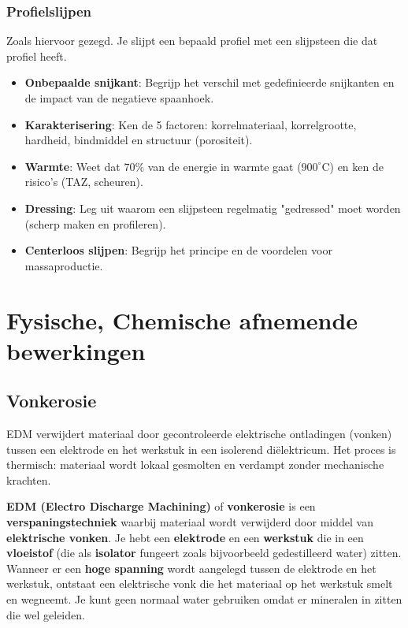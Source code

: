 \documentclass[a4paper,12pt,twoside]{report}
\begin{document}
\subsection{Profielslijpen}
Zoals hiervoor gezegd. Je slijpt een bepaald profiel met een slijpsteen die dat profiel heeft.

\begin{warningbox}[title=EXAMEN CHECKLIST: SLIJPEN]
    \begin{itemize}
        \item \textbf{Onbepaalde snijkant}: Begrijp het verschil met gedefinieerde snijkanten en de impact van de negatieve spaanhoek.
        \item \textbf{Karakterisering}: Ken de 5 factoren: korrelmateriaal, korrelgrootte, hardheid, bindmiddel en structuur (porositeit).
        \item \textbf{Warmte}: Weet dat $70\%$ van de energie in warmte gaat ($900^\circ$C) en ken de risico's (TAZ, scheuren).
        \item \textbf{Dressing}: Leg uit waarom een slijpsteen regelmatig "gedressed" moet worden (scherp maken en profileren).
        \item \textbf{Centerloos slijpen}: Begrijp het principe en de voordelen voor massaproductie.
    \end{itemize}
\end{warningbox}

\chapter{Fysische, Chemische afnemende bewerkingen}

\section{Vonkerosie}

\begin{conceptbox}[title=EDM (Electro Discharge Machining)]
    EDM verwijdert materiaal door gecontroleerde elektrische ontladingen (vonken) tussen een elektrode en het werkstuk in een isolerend diëlektricum. Het proces is thermisch: materiaal wordt lokaal gesmolten en verdampt zonder mechanische krachten.
\end{conceptbox}

\textbf{EDM (Electro Discharge Machining)} of \textbf{vonkerosie} is een \textbf{verspaningstechniek} waarbij materiaal wordt
verwijderd door middel van \textbf{elektrische vonken}.
Je hebt een \textbf{elektrode} en een \textbf{werkstuk} die in een \textbf{vloeistof} (die als \textbf{isolator} fungeert zoals bijvoorbeeld gedestilleerd water) zitten.
Wanneer er een \textbf{hoge spanning} wordt aangelegd tussen de elektrode en het werkstuk, ontstaat
een elektrische vonk die het materiaal op het werkstuk smelt en wegneemt.
\newline
Je kunt geen normaal water gebruiken omdat er mineralen in zitten die wel geleiden.
\end{document}

